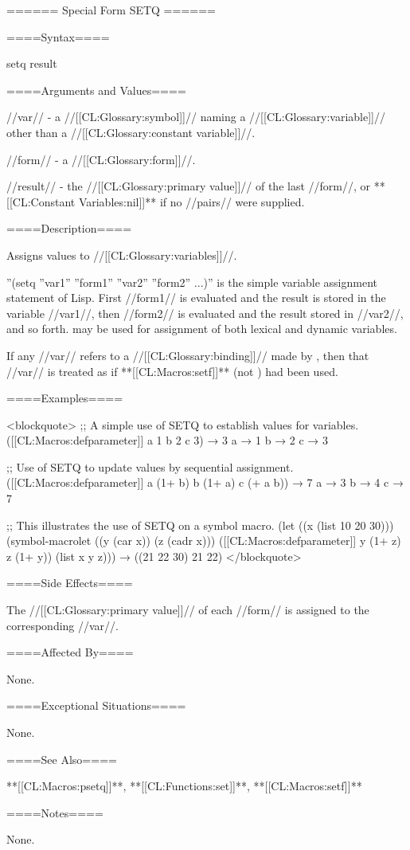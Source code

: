 ====== Special Form SETQ ======

====Syntax====

\DefspecWithValues setq {} {result}


====Arguments and Values====

//var// - a //[[CL:Glossary:symbol]]// naming a //[[CL:Glossary:variable]]// other than a //[[CL:Glossary:constant variable]]//.

//form// - a //[[CL:Glossary:form]]//.

//result// - the //[[CL:Glossary:primary value]]// of the last //form//, or **[[CL:Constant Variables:nil]]** if no //pairs// were supplied.

====Description====

Assigns values to //[[CL:Glossary:variables]]//.

''(setq ''var1'' ''form1'' ''var2'' ''form2'' ...)'' is the simple variable assignment statement of Lisp. First //form1// is evaluated and the result is stored in the variable //var1//, then //form2// is evaluated and the result stored in //var2//, and so forth.  may be used for assignment of both lexical and dynamic variables.

If any //var// refers to a //[[CL:Glossary:binding]]// made by , then that //var// is treated as if **[[CL:Macros:setf]]** (not ) had been used.

====Examples====

<blockquote> ;; A simple use of SETQ to establish values for variables. ([[CL:Macros:defparameter]] a 1 b 2 c 3) → 3 a → 1 b → 2 c → 3

;; Use of SETQ to update values by sequential assignment. ([[CL:Macros:defparameter]] a (1+ b) b (1+ a) c (+ a b)) → 7 a → 3 b → 4 c → 7

;; This illustrates the use of SETQ on a symbol macro. (let ((x (list 10 20 30))) (symbol-macrolet ((y (car x)) (z (cadr x))) ([[CL:Macros:defparameter]] y (1+ z) z (1+ y)) (list x y z))) → ((21 22 30) 21 22) </blockquote>

====Side Effects====

The //[[CL:Glossary:primary value]]// of each //form// is assigned to the corresponding //var//.

====Affected By====

None.

====Exceptional Situations====

None.

====See Also====

**[[CL:Macros:psetq]]**, **[[CL:Functions:set]]**, **[[CL:Macros:setf]]**

====Notes====

None.

